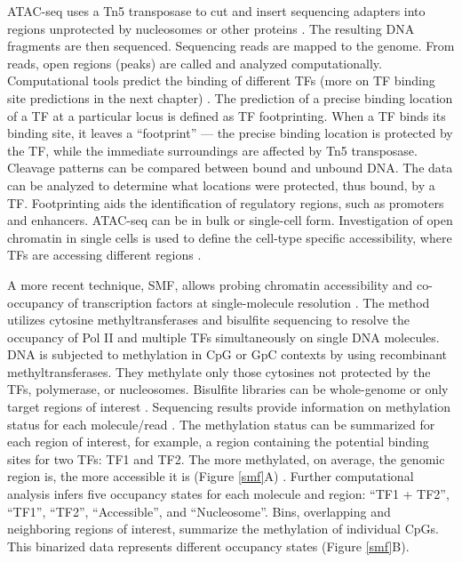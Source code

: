     ATAC-seq uses a Tn5 transposase to cut and insert sequencing adapters into regions unprotected by nucleosomes or other proteins \cite{yan2020reads}. The resulting DNA fragments are then sequenced. Sequencing reads are mapped to the genome. From reads, open regions (peaks) are called and analyzed computationally. Computational tools predict the binding of different TFs (more on TF binding site predictions in the next chapter) \cite{yan2020reads}. The prediction of a precise binding location of a TF at a particular locus is defined as TF footprinting. When a TF binds its binding site, it leaves a ``footprint'' --- the precise binding location is protected by the TF, while the immediate surroundings are affected by Tn5 transposase. Cleavage patterns can be compared between bound and unbound DNA. The data can be analyzed to determine what locations were protected, thus bound, by a TF. Footprinting aids the identification of regulatory regions, such as promoters and enhancers. ATAC-seq can be in bulk or single-cell form. Investigation of open chromatin in single cells is used to define the cell-type specific accessibility, where TFs are accessing different regions \cite{yan2020reads}.

    A more recent technique, \ac{SMF}, allows probing chromatin accessibility and co-occupancy of transcription factors at single-molecule resolution \cite{sonmezer2021molecular,kleinendorst2021genome}. The method utilizes cytosine methyltransferases and bisulfite sequencing to resolve the occupancy of Pol II and multiple TFs simultaneously on single DNA molecules. DNA is subjected to methylation in CpG or GpC contexts by using recombinant methyltransferases. They methylate only those cytosines not protected by the TFs, polymerase, or nucleosomes. Bisulfite libraries can be whole-genome or only target regions of interest \cite{kleinendorst2021genome}. Sequencing results provide information on methylation status for each molecule/read \cite{sonmezer2021molecular,kleinendorst2021genome}. The methylation status can be summarized for each region of interest, for example, a region containing the potential binding sites for two TFs: TF1 and TF2. The more methylated, on average, the genomic region is, the more accessible it is ({Figure \ref{smf}}A) \cite{sonmezer2021molecular,kleinendorst2021genome}. Further computational analysis infers five occupancy states for each molecule and region: ``TF1 + TF2'', ``TF1'', ``TF2'', ``Accessible'', and ``Nucleosome''. Bins, overlapping and neighboring regions of interest, summarize the methylation of individual CpGs. This binarized data represents different occupancy states ({Figure \ref{smf}}B).


